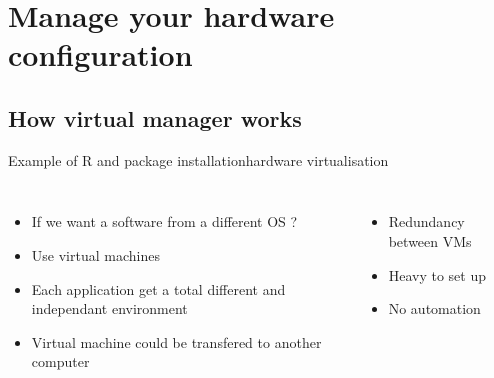\section{Manage your hardware configuration}
\subsection{How virtual manager works}

\begin{frame}{Example of R and package installation}{hardware virtualisation}
\begin{columns}
\begin{itemize}[<+->]
	\item If we want a software from a different OS ?
	\item Use virtual machines
	\item Each application get a total different and independant environment
	\item Virtual machine could be transfered to another computer
\end{itemize}
\begin{itemize}[<+->]
	\item Redundancy between VMs
	\item Heavy to set up
	\item No automation
\end{itemize}
\end{columns}
\end{frame}

